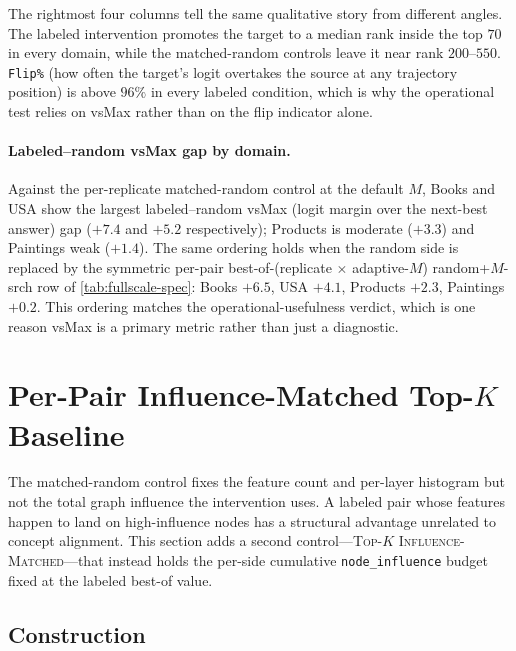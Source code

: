 The rightmost four columns tell the same qualitative story from different angles. The labeled intervention promotes the target to a median rank inside the top $70$ in every domain, while the matched-random controls leave it near rank $200$--$550$. \texttt{Flip\%} (how often the target's logit overtakes the source at any trajectory position) is above $96\%$ in every labeled condition, which is why the operational test relies on vsMax rather than on the flip indicator alone.

\paragraph{Labeled--random vsMax gap by domain.}
Against the per-replicate matched-random control at the default $M$, Books and USA show the largest labeled--random vsMax (logit margin over the next-best answer) gap ($+7.4$ and $+5.2$ respectively); Products is moderate ($+3.3$) and Paintings weak ($+1.4$). The same ordering holds when the random side is replaced by the symmetric per-pair best-of-(replicate $\times$ adaptive-$M$) random+$M$-srch row of \cref{tab:fullscale-spec}: Books $+6.5$, USA $+4.1$, Products $+2.3$, Paintings $+0.2$. This ordering matches the operational-usefulness verdict, which is one reason vsMax is a primary metric rather than just a diagnostic.


\section{Per-Pair Influence-Matched Top-$K$ Baseline}
\label{appx:topkim}

The matched-random control fixes the feature count and per-layer histogram but not the total graph influence the intervention uses. A labeled pair whose features happen to land on high-influence nodes has a structural advantage unrelated to concept alignment. This section adds a second control---\textsc{Top-$K$ Influence-Matched}---that instead holds the per-side cumulative \texttt{node\_influence} budget fixed at the labeled best-of value.

\subsection{Construction}

